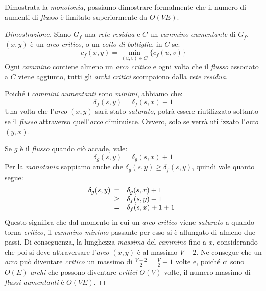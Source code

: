 \noindent
Dimostrata la \emph{monotonia}, possiamo dimostrare formalmente che il numero
di aumenti di \emph{flusso} è limitato superiormente da $O(VE)$.

\begin{proof}[Dimostrazione]
    Siano $G_f$ una \emph{rete residua} e $C$ un \emph{cammino aumentante} di
    $G_f$. $(x,y)$ è un \emph{arco critico}, o un \emph{collo di bottiglia},
    in $C$ se:
    \[c_f(x,y)=\min_{(u,v)\in C}\{c_f(u,v)\}\]
    Ogni \emph{cammino} contiene almeno un \emph{arco critico} e ogni volta che
    il \emph{flusso} associato a $C$ viene aggiunto, tutti gli \emph{archi
    critici} scompaiono dalla \emph{rete residua}.

    \noindent
    Poiché i \emph{cammini aumentanti} sono \emph{minimi}, abbiamo che:
    \[\delta_f(s,y)=\delta_f(s,x)+1\]
    Una volta che l'\emph{arco} $(x,y)$ sarà stato \emph{saturato}, potrà essere
    riutilizzato soltanto se il \emph{flusso} attraverso quell'\emph{arco}
    diminuisce. Ovvero, solo se verrà utilizzato l'\emph{arco} $(y,x)$.

    Se $g$ è il \emph{flusso} quando ciò accade, vale:
    \[\delta_g(s,y)=\delta_g(s,x)+1\]
    Per la \emph{monotonia} sappiamo anche che $\delta_g(s,y)\geq\delta_f(s,y)$,
    quindi vale quanto segue:
    \[\delta_g(s,y)\begin{array}[t]{cl}
        = & \delta_g(s,x)+1\\
        \geq & \delta_f(s,y)+1\\
        = & \delta_f(s,x)+1+1
    \end{array}\]
    Questo significa che dal momento in cui un \emph{arco critico} viene
    \emph{saturato} a quando torna \emph{critico}, il \emph{cammino minimo}
    passante per esso si è allungato di almeno due passi. Di conseguenza, la
    lunghezza \emph{massima} del \emph{cammino} fino a $x$, considerando che
    poi si deve attraversare l'\emph{arco} $(x,y)$ è al massimo $V-2$. Ne
    consegue che un \emph{arco} può diventare \emph{critico} un massimo di
    $\frac{V-2}{2}=\frac{V}{2}-1$ volte e, poiché ci sono $O(E)$ \emph{archi}
    che possono diventare \emph{critici} $O(V)$ volte, il numero massimo di
    \emph{flussi aumentanti} è $O(VE)$.
\end{proof}

